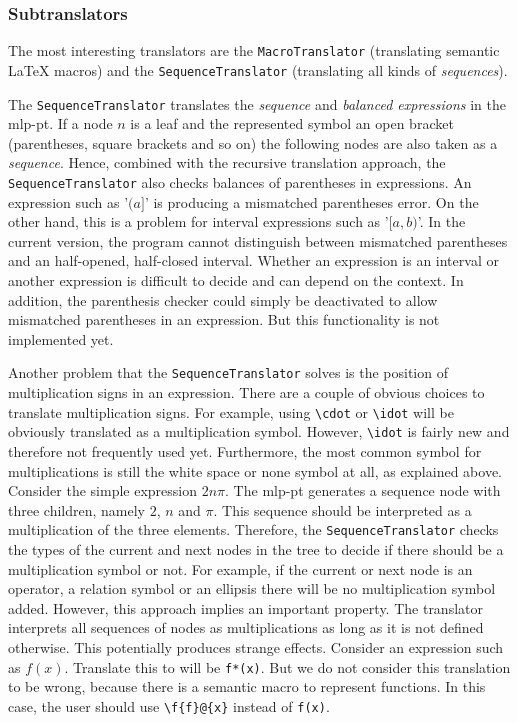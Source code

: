 \subsubsection{Subtranslators}
The most interesting translators are the \verb|MacroTranslator| (translating semantic \LaTeX{} macros) and the \verb|SequenceTranslator| (translating all kinds of \textit{sequences}).

The \verb|SequenceTranslator| translates the \textit{sequence} and \textit{balanced expressions} in the \gls{mlp-pt}. If a node $n$ is a leaf and the represented symbol an open bracket (parentheses, square brackets and so on) the following nodes are also taken as a \textit{sequence}. Hence, combined with the recursive translation approach, the \verb|SequenceTranslator| also checks balances of parentheses in expressions. An expression such as '$(a]$' is producing a mismatched parentheses error. On the other hand, this is a problem for interval expressions such as '$[a,b)$'. In the current version, the program cannot distinguish between mismatched parentheses and an half-opened, half-closed interval. Whether an expression is an interval or another expression is difficult to decide and can depend on the context. In addition, the parenthesis checker could simply be deactivated to allow mismatched parentheses in an expression. But this functionality is not implemented yet.

Another problem that the \verb|SequenceTranslator| solves is the position of multiplication signs in an expression. There are a couple of obvious choices to translate multiplication signs. For example, using \verb|\cdot| or \verb|\idot| will be obviously translated as a multiplication symbol. However, \verb|\idot| is fairly new and therefore not frequently used yet. Furthermore, the most common symbol for multiplications is still the white space or none symbol at all, as explained above. Consider the simple expression $2n\pi$. The \gls{mlp-pt} generates a sequence node with three children, namely $2$, $n$ and $\pi$. This sequence should be interpreted as a multiplication of the three elements. Therefore, the \verb|SequenceTranslator| checks the types of the current and next nodes in the tree to decide if there should be a multiplication symbol or not. For example, if the current or next node is an operator, a relation symbol or an ellipsis there will be no multiplication symbol added. However, this approach implies an important property. The translator interprets all sequences of nodes as multiplications as long as it is not defined otherwise. This potentially produces strange effects. Consider an expression such as $f(x)$. Translate this to \Maple{} will be \verb|f*(x)|. But we do not consider this translation to be wrong, because there is a semantic macro to represent functions. In this case, the user should use \verb|\f{f}@{x}| instead of \verb|f(x)|.


